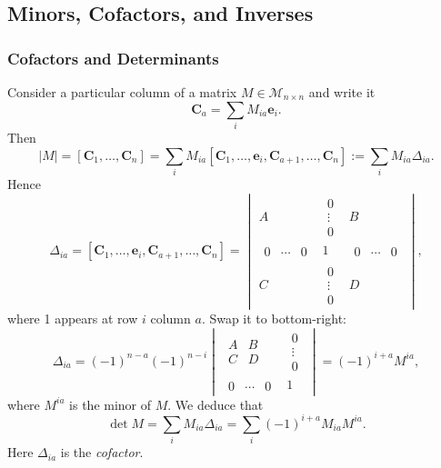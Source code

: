 \documentclass[a4paper]{article}
\begin{document}
    \subsection{Minors, Cofactors, and Inverses}
    \subsubsection{Cofactors and Determinants}
    Consider a particular column of a matrix $ M\in
    \mathcal{M}_{n\times n} $ and write it
    \[
      \mathbf{C}_a=\sum_{i}M_{ia}\mathbf{e}_i
    .\]
    Then
    \[
      |M|=[\mathbf{C}_1,\dots,\mathbf{C}_n]=\sum_{i}M_{ia}[\mathbf{C}_1,\dots,\mathbf{e}_i,\mathbf{C}_{a+1},\dots,\mathbf{C}_n]:=
      \sum_i M_{ia}\Delta_{ia}
    .\]
    Hence
    \[
      \Delta_{ia}=[\mathbf{C}_1,\dots,\mathbf{e}_i,\mathbf{C}_{a+1},\dots,\mathbf{C}_n]=
      \begin{vmatrix}
        A &
        \begin{matrix}
          0\\ \vdots \\ 0
        \end{matrix} & B\\
        \begin{matrix}
          0 & \cdots & 0
        \end{matrix} & 1 &
        \begin{matrix}
          0 & \cdots & 0
        \end{matrix}\\
        C &
        \begin{matrix}
          0\\ \vdots \\ 0
        \end{matrix} & D
      \end{vmatrix}
    ,\]
    where 1 appears at row $i$ column $a$. Swap it to bottom-right:
    \[
      \Delta_{ia}=(-1)^{n-a}(-1)^{n-i}
      \begin{vmatrix}
        \begin{matrix}
          A&B\\C&D
        \end{matrix}&
        \begin{matrix}
          0\\ \vdots \\ 0
        \end{matrix}\\
        \begin{matrix}
          0 & \cdots & 0
        \end{matrix}&1
      \end{vmatrix}=(-1)^{i+a}M^{ia}
    ,\]
    where $ M^{ia} $ is the minor of $M$. We deduce that
    \[
      \det M = \sum_{i} M_{ia}\Delta_{ia}=\sum_{i}(-1)^{i+a}M_{ia}M^{ia}
    .\]
    Here $\Delta_{ia}$ is the \textit{cofactor}.
\end{document}

